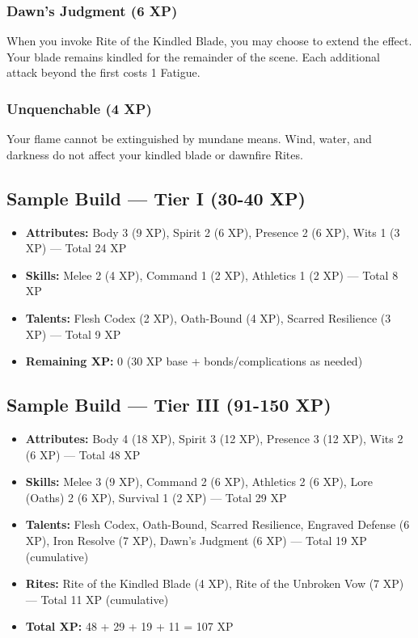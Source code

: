 \subsubsection{Dawn's Judgment (6 XP)}

When you invoke Rite of the Kindled Blade, you may choose to extend the effect. Your blade remains kindled for the remainder of the scene. Each additional attack beyond the first costs 1 Fatigue.

\subsubsection{Unquenchable (4 XP)}

Your flame cannot be extinguished by mundane means. Wind, water, and darkness do not affect your kindled blade or dawnfire Rites.

\subsection{Sample Build — Tier I (30-40 XP)}

\begin{itemize}
\item \textbf{Attributes:} Body 3 (9 XP), Spirit 2 (6 XP), Presence 2 (6 XP), Wits 1 (3 XP) — Total 24 XP
\item \textbf{Skills:} Melee 2 (4 XP), Command 1 (2 XP), Athletics 1 (2 XP) — Total 8 XP
\item \textbf{Talents:} Flesh Codex (2 XP), Oath-Bound (4 XP), Scarred Resilience (3 XP) — Total 9 XP
\item \textbf{Remaining XP:} 0 (30 XP base + bonds/complications as needed)
\end{itemize}

\subsection{Sample Build — Tier III (91-150 XP)}

\begin{itemize}
\item \textbf{Attributes:} Body 4 (18 XP), Spirit 3 (12 XP), Presence 3 (12 XP), Wits 2 (6 XP) — Total 48 XP
\item \textbf{Skills:} Melee 3 (9 XP), Command 2 (6 XP), Athletics 2 (6 XP), Lore (Oaths) 2 (6 XP), Survival 1 (2 XP) — Total 29 XP
\item \textbf{Talents:} Flesh Codex, Oath-Bound, Scarred Resilience, Engraved Defense (6 XP), Iron Resolve (7 XP), Dawn's Judgment (6 XP) — Total 19 XP (cumulative)
\item \textbf{Rites:} Rite of the Kindled Blade (4 XP), Rite of the Unbroken Vow (7 XP) — Total 11 XP (cumulative)
\item \textbf{Total XP:} 48 + 29 + 19 + 11 = 107 XP
\end{itemize}

